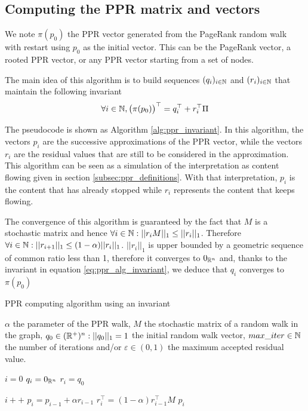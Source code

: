 \subsection{Computing the PPR matrix and vectors}
We note $\pi(p_0)$ the PPR vector generated from the PageRank random walk with restart using $p_0$ as the initial vector. This can be the PageRank vector, a rooted PPR vector, or any PPR vector starting from a set of nodes.

The main idea of this algorithm is to build sequences $(q_i)_{i\in \mathbb{N}}$ and $(r_i)_{i\in \mathbb{N}}$ that maintain the following invariant
\begin{equation}\label{eq:ppr_alg_invariant}
    \forall i \in \mathbb{N}, \big(\pi(p_0)\big)^\top = q_i^\top + r_i^\top\Pi
\end{equation}

The pseudocode is shown as Algorithm \ref{alg:ppr_invariant}. In this algorithm, the vectors $p_i$ are the successive approximations of the PPR vector, while the vectors $r_i$ are the residual values that are still to be considered in the approximation. This algorithm can be seen as a simulation of the interpretation as content flowing given in section \ref{subsec:ppr_definitions}. With that interpretation, $p_i$ is the content that has already stopped while $r_i$ represents the content that keeps flowing.

The convergence of this algorithm is guaranteed by the fact that $M$ is a stochastic matrix and hence $\forall i \in \mathbb{N} : ||r_iM||_1 \leq ||r_i||_1$. Therefore $\forall i \in \mathbb{N} : ||r_{i+1}||_1 \leq (1-\alpha)||r_i||_1$. $||r_i||_1$ is upper bounded by a geometric sequence of common ratio less than 1, therefore it converges to $0_{\mathbb{R}^n}$ and, thanks to the invariant in equation \ref{eq:ppr_alg_invariant}, we deduce that $q_i$ converges to $\pi(p_0)$

\begin{algorithm}
\caption{PPR computing algorithm using an invariant}
\label{alg:ppr_invariant}
\begin{algorithmic}[1]
    \Require $\alpha$ the parameter of the PPR walk, $M$ the stochastic matrix of a random walk in the graph, $q_0 \in (\mathbb{R}^+)^n : ||q_0||_1 = 1$ the initial random walk vector, $max\_iter\in \mathbb{N}$ the number of iterations and/or $\varepsilon \in (0, 1)$ the maximum accepted residual value.

    \State $i = 0$
    \State $q_i = 0_{\mathbb{R}^n}$
    \State $r_i = q_0$

        \State $i++$
        \State $p_i = p_{i-1} + \alpha r_{i-1}$
        \State $r_i^\top = (1-\alpha) r_{i - 1}^\top M$
    \EndWhile
    \State \Return $p_i$
\end{algorithmic}
\end{algorithm}

